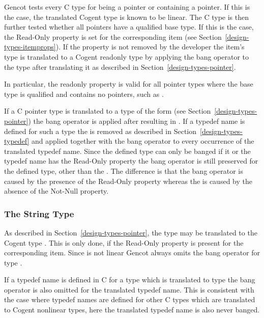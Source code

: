 Gencot tests every C type for being a pointer or containing a pointer. If this is the case, the translated Cogent 
type is known to be linear. The C type is then further tested whether all pointers have a  qualified
base type. If this is the case, the Read-Only property is set for the corresponding item (see Section~\ref{design-types-itemprops}). 
If the property is not removed by the developer the item's type is translated to a Cogent readonly type
by applying the bang operator \code{!} to the type after translating it as described in Section~\ref{design-types-pointer}.

In particular, the readonly property is valid for all pointer types where the base type is  qualified 
and contains no pointers, such as .

If a C pointer type is translated to a type of the form  (see Section~\ref{design-types-pointer}) the bang operator
is applied after  resulting in . If a typedef name is defined for such a type the
 is removed as described in Section~\ref{design-types-typedef} and applied together with the bang operator
to every occurrence of the translated typedef name. Since the defined type can only be banged if it or the typedef name
has the Read-Only property the bang operator is still preserved for the defined type, other than the . 
The difference is that the bang operator is caused by the presence of the Read-Only property whereas the 
is caused by the absence of the Not-Null property.

\subsubsection{The String Type}

As described in Section~\ref{design-types-pointer}, the type  may be translated to the Cogent type .
This is only done, if the Read-Only property is present for the corresponding item. Since  is not linear
Gencot always omits the bang operator for type .

If a typedef name is defined in C for a type which is translated to type  the bang operator is also omitted
for the translated typedef name. This is consistent with the case where typedef names are defined for other C types which
are translated to Cogent nonlinear types, here the translated typedef name is also never banged.

